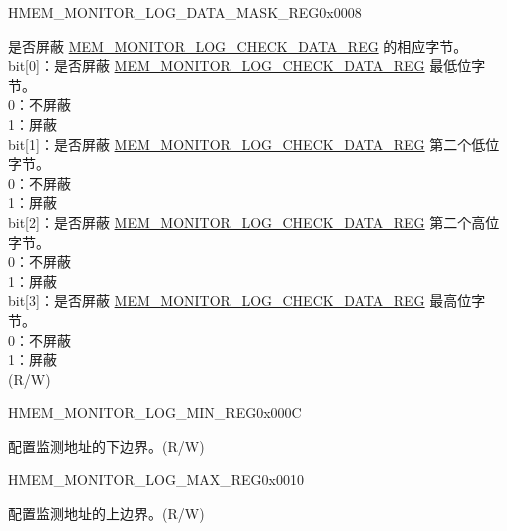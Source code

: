 \begin{register}{H}{MEM\_MONITOR\_LOG\_DATA\_MASK\_REG}{0x0008}\label{regdesc:MEMMONITORLOGDATAMASKREG}
%
%
\regnewline%
\begin{regdesc}\begin{reglist}
\label{fielddesc:MEMMONITORLOGDATAMASK}\item[MEM\_MONITOR\_LOG\_DATA\_MASK] 是否屏蔽 \hyperref[regdesc:MEMMONITORLOGCHECKDATAREG]{MEM\_MONITOR\_LOG\_CHECK\_DATA\_REG} 的相应字节。\\
bit[0]：是否屏蔽 \hyperref[regdesc:MEMMONITORLOGCHECKDATAREG]{MEM\_MONITOR\_LOG\_CHECK\_DATA\_REG} 最低位字节。\\
0：不屏蔽\\
1：屏蔽\\
bit[1]：是否屏蔽 \hyperref[regdesc:MEMMONITORLOGCHECKDATAREG]{MEM\_MONITOR\_LOG\_CHECK\_DATA\_REG} 第二个低位字节。\\
0：不屏蔽\\
1：屏蔽\\
bit[2]：是否屏蔽 \hyperref[regdesc:MEMMONITORLOGCHECKDATAREG]{MEM\_MONITOR\_LOG\_CHECK\_DATA\_REG} 第二个高位字节。\\
0：不屏蔽\\
1：屏蔽\\
bit[3]：是否屏蔽 \hyperref[regdesc:MEMMONITORLOGCHECKDATAREG]{MEM\_MONITOR\_LOG\_CHECK\_DATA\_REG} 最高位字节。\\
0：不屏蔽\\
1：屏蔽\\
(R/W)
\end{reglist}\end{regdesc}
\end{register}


\begin{register}{H}{MEM\_MONITOR\_LOG\_MIN\_REG}{0x000C}\label{regdesc:MEMMONITORLOGMINREG}
%
\regnewline%
\begin{regdesc}\begin{reglist}
\label{fielddesc:MEMMONITORLOGMIN}\item [MEM\_MONITOR\_LOG\_MIN] 配置监测地址的下边界。(R/W)
\end{reglist}\end{regdesc}
\end{register}


\begin{register}{H}{MEM\_MONITOR\_LOG\_MAX\_REG}{0x0010}\label{regdesc:MEMMONITORLOGMAXREG}
%
\regnewline%
\begin{regdesc}\begin{reglist}
\label{fielddesc:MEMMONITORLOGMAX}\item [MEM\_MONITOR\_LOG\_MAX] 配置监测地址的上边界。(R/W)
\end{reglist}\end{regdesc}
\end{register}


